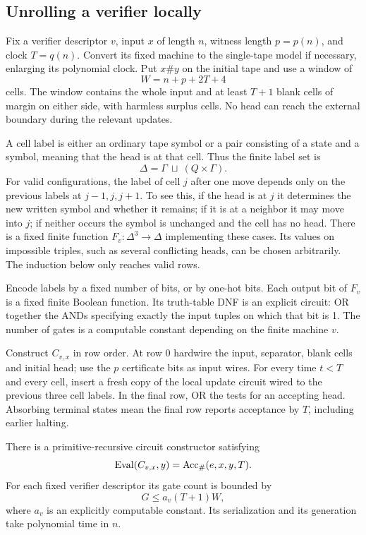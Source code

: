 \subsection{Unrolling a verifier locally}

Fix a verifier descriptor \(v\), input \(x\) of length \(n\), witness length
\(p=p(n)\), and clock \(T=q(n)\). Convert its fixed machine to the
single-tape model if necessary, enlarging its polynomial clock. Put
\(x\#y\) on the initial tape and use a window of
\[
 W=n+p+2T+4
\]
cells. The window contains the whole input and at least \(T+1\) blank cells
of margin on either side, with harmless surplus cells. No head can reach
the external boundary during the relevant updates.

A cell label is either an ordinary tape symbol or a pair consisting of a
state and a symbol, meaning that the head is at that cell. Thus the finite
label set is
\[
 \Delta=\Gamma\ \sqcup\ (Q\times\Gamma).
\]
For valid configurations, the label of cell \(j\) after one move depends
only on the previous labels at \(j-1,j,j+1\). To see this, if the head is
at \(j\) it determines the new written symbol and whether it remains; if
it is at a neighbor it may move into \(j\); if neither occurs the symbol is
unchanged and the cell has no head. There is a fixed finite function
\(F_v:\Delta^3\to\Delta\) implementing these cases. Its values on
impossible triples, such as several conflicting heads, can be chosen
arbitrarily. The induction below only reaches valid rows.

Encode labels by a fixed number of bits, or by one-hot bits. Each output
bit of \(F_v\) is a fixed finite Boolean function. Its truth-table DNF is
an explicit circuit: OR together the ANDs specifying exactly the input
tuples on which that bit is 1. The number of gates is a computable constant
depending on the finite machine \(v\).

Construct \(C_{v,x}\) in row order. At row 0 hardwire the input, separator,
blank cells and initial head; use the \(p\) certificate bits as input wires.
For every time \(t<T\) and every cell, insert a fresh copy of the local
update circuit wired to the previous three cell labels. In the final row,
OR the tests for an accepting head. Absorbing terminal states mean the final
row reports acceptance by \(T\), including earlier halting.

\begin{lemma}
\label{lem:unroll}
There is a primitive-recursive circuit constructor satisfying
\[
 \operatorname{Eval}(C_{v,x},y)
   =\operatorname{Acc}_{\#}(e,x,y,T).
\]
For each fixed verifier descriptor its gate count is bounded by
\[
 G\le a_v(T+1)W,
\]
where \(a_v\) is an explicitly computable constant. Its serialization and
its generation take polynomial time in \(n\).
\end{lemma}

